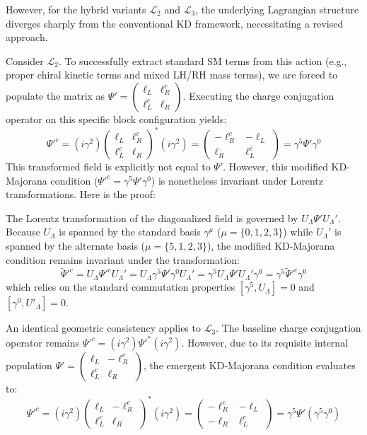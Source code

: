 However, for the hybrid variants $\mathcal{L}_2$ and $\mathcal{L}_3$, the underlying Lagrangian structure diverges sharply from the conventional KD framework, necessitating a revised approach.

Consider $\mathcal{L}_2$. To successfully extract standard SM terms from this action (e.g., proper chiral kinetic terms and mixed LH/RH mass terms), we are forced to populate the matrix as $\Psi'=\begin{pmatrix}\ell_L& \ell_R^c\\ \ell_L^c & \ell_R  \end{pmatrix}$. Executing the charge conjugation operator on this specific block configuration yields: 
\[ \Psi'^c=(i\gamma^2)\begin{pmatrix}\ell_L& \ell_R^c\\ \ell_L^c & \ell_R  \end{pmatrix}^*(i\gamma^2)=\begin{pmatrix}-\ell_R^c& -\ell_L\\ \ell_R & \ell_L^c  \end{pmatrix}=\gamma^5\Psi'\gamma^0\]
This transformed field is explicitly not equal to $\Psi'$. However, this modified KD-Majorana condition ($\Psi'^c=\gamma^5\Psi'\gamma^0$) is nonetheless invariant under Lorentz transformations. Here is the proof:

The Lorentz transformation of the diagonalized field is governed by $U_\Lambda\Psi'U_\Lambda'$. Because $U_\Lambda$ is spanned by the standard basis $\gamma^\mu$ ($\mu=\{0,1,2,3\}$) while $U_\Lambda'$ is spanned by the alternate basis ($\mu=\{5,1,2,3\}$), the modified KD-Majorana condition remains invariant under the transformation: 
\[\tilde\Psi'^c=U_\Lambda\Psi'^cU_\Lambda'=U_\Lambda\gamma^5\Psi'\gamma^0U_\Lambda'=\gamma^5U_\Lambda\Psi'U_\Lambda'\gamma^0 =\gamma^5\tilde\Psi'^c\gamma^0\]
which relies on the standard commutation properties $[\gamma^5,U_\Lambda]=0$ and $[\gamma^0,U'_\Lambda]=0$.

An identical geometric consistency applies to $\mathcal{L}_3$. The baseline charge conjugation operator remains $\Psi'^c=(i\gamma^2)\Psi'^*(i\gamma^2)$. However, due to its requisite internal population $\Psi'=\begin{pmatrix}\ell_L& -\ell_R^c\\ \ell_L^c & \ell_R  \end{pmatrix}$, the emergent KD-Majorana condition evaluates to:
\[ \Psi'^c=(i\gamma^2)\begin{pmatrix}\ell_L& -\ell_R^c\\ \ell_L^c & \ell_R  \end{pmatrix}^*(i\gamma^2)=\begin{pmatrix}-\ell_R^c& -\ell_L\\ -\ell_R & \ell_L^c  \end{pmatrix}=\gamma^5\Psi'(\gamma^5\gamma^0)\]

